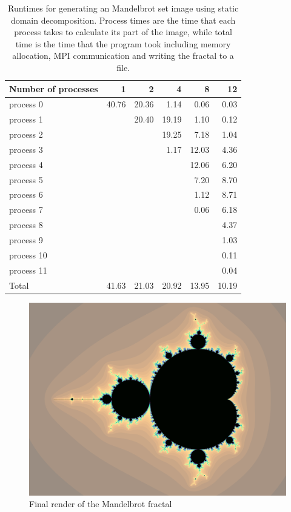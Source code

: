 \documentclass[a4paper]{article}
\begin{document}
\begin{table}[h]
	\centering
	\caption{Runtimes for generating an Mandelbrot set image using static domain decomposition. Process times are the time that each process takes to calculate its part of the image, while total time is the time that the program took including memory allocation, MPI communication and writing the fractal to a file.}
	\label{tbl:mandelbrot}
	\begin{tabular}{l|r|r|r|r|r}
		Number of processes & 1 & 2 & 4 & 8 & 12 \\ \hline
		process 0  & 40.76 & 20.36 &  1.14 &  0.06 &  0.03 \\
		process 1  &       & 20.40 & 19.19 &  1.10 &  0.12 \\
		process 2  &       &       & 19.25 &  7.18 &  1.04 \\
		process 3  &       &       &  1.17 & 12.03 &  4.36 \\
		process 4  &       &       &       & 12.06 &  6.20 \\
		process 5  &       &       &       &  7.20 &  8.70 \\
		process 6  &       &       &       &  1.12 &  8.71 \\
		process 7  &       &       &       &  0.06 &  6.18 \\
		process 8  &       &       &       &       &  4.37 \\
		process 9  &       &       &       &       &  1.03 \\
		process 10 &       &       &       &       &  0.11 \\
		process 11 &       &       &       &       &  0.04 \\ \hline
		Total      & 41.63 & 21.03 & 20.92 & 13.95 & 10.19
	\end{tabular}
\end{table}

\begin{figure}[h!]
	\centering
	\includegraphics[width=.75\textwidth]{mandelbrot/mandelbrot.png}
	\caption{Final render of the Mandelbrot fractal}
	\label{fig:mandelbrot}
\end{figure}
\end{document}
